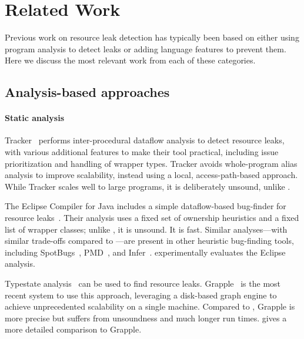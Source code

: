 \section{Related Work}
\label{sec:relatedwork}

Previous work on resource leak detection has typically been based on either
using program analysis to detect leaks or adding language features to prevent
them. Here we discuss the most relevant work from each of these categories.

\subsection{Analysis-based approaches}\label{sec:rw-analysis}


\paragraph{Static analysis}
Tracker~\cite{TorlakC10} performs inter-procedural dataflow analysis to detect
resource leaks, with various additional features to make their tool practical,
including issue prioritization and handling of wrapper types.  Tracker avoids
whole-program alias analysis to improve scalability, instead using a local,
access-path-based approach.  While Tracker scales well to large programs, it is
deliberately unsound, unlike \Tool.

The Eclipse Compiler for Java includes a simple dataflow-based
bug-finder for resource leaks~\cite{ecj-resource-leak}. Their analysis
uses a fixed set of ownership heuristics and a fixed list of wrapper
classes; unlike \Tool, it is unsound. It is fast.  Similar analyses---with similar trade-offs
compared to \Tool---are present in other heuristic bug-finding tools,
including SpotBugs~\cite{spotbugs-resource-leak},
PMD~\cite{pmd-resource-leak}, and Infer~\cite{infer-resource-leak}.
 experimentally evaluates the Eclipse analysis.

Typestate analysis~\cite{StromY86,FinkYDRG2008} can be used to
find resource leaks.  Grapple~\cite{zuo2019grapple} is the most recent system to
use this approach, leveraging a disk-based graph engine to achieve unprecedented
scalability on a single machine.  Compared to \Tool, Grapple
is more precise but
suffers from unsoundness and much longer run times.
 gives a more detailed comparison to Grapple.

